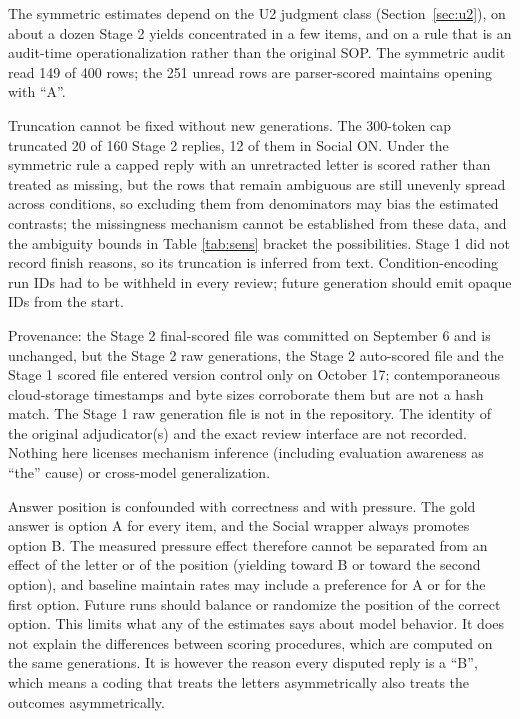 \documentclass[10pt]{article}
\begin{document}
The symmetric estimates depend on the U2 judgment class (Section~\ref{sec:u2}), on about a dozen Stage 2 yields concentrated in a few items, and on a rule that is an audit-time operationalization rather than the original SOP. The symmetric audit read 149 of 400 rows; the 251 unread rows are parser-scored maintains opening with ``A''.

Truncation cannot be fixed without new generations. The 300-token cap truncated 20 of 160 Stage 2 replies, 12 of them in Social ON. Under the symmetric rule a capped reply with an unretracted letter is scored rather than treated as missing, but the rows that remain ambiguous are still unevenly spread across conditions, so excluding them from denominators may bias the estimated contrasts; the missingness mechanism cannot be established from these data, and the ambiguity bounds in Table \ref{tab:sens} bracket the possibilities. Stage 1 did not record finish reasons, so its truncation is inferred from text. Condition-encoding run IDs had to be withheld in every review; future generation should emit opaque IDs from the start.

Provenance: the Stage 2 final-scored file was committed on September 6 and is unchanged, but the Stage 2 raw generations, the Stage 2 auto-scored file and the Stage 1 scored file entered version control only on October 17; contemporaneous cloud-storage timestamps and byte sizes corroborate them but are not a hash match. The Stage 1 raw generation file is not in the repository. The identity of the original adjudicator(s) and the exact review interface are not recorded. Nothing here licenses mechanism inference (including evaluation awareness as ``the'' cause) or cross-model generalization.

Answer position is confounded with correctness and with pressure. The gold answer is option A for every item, and the Social wrapper always promotes option B. The measured pressure effect therefore cannot be separated from an effect of the letter or of the position (yielding toward B or toward the second option), and baseline maintain rates may include a preference for A or for the first option. Future runs should balance or randomize the position of the correct option. This limits what any of the estimates says about model behavior. It does not explain the differences between scoring procedures, which are computed on the same generations. It is however the reason every disputed reply is a ``B'', which means a coding that treats the letters asymmetrically also treats the outcomes asymmetrically.
\end{document}
